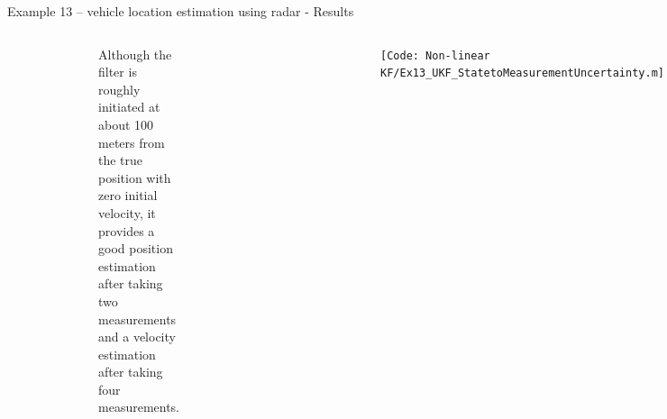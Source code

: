 \begin{frame}{Example 13 – vehicle location estimation using radar - Results}
\begin{columns}
\begin{figure}
    \vspace{-17pt}
\end{figure}
    {\footnotesize Although the filter is roughly initiated at about 100 meters from the true position with zero initial velocity, it provides a good position estimation after taking two measurements and a velocity estimation after taking four measurements.}
        \vspace{-25pt}
        \begin{figure}
            \centering
            \includegraphics[width=0.7\linewidth]{Figures//Part3/Ex13_Vehicle_xVelocity.png}
        \end{figure}
        \vspace{-15pt}
        \begin{figure}
            \centering
            \includegraphics[width=0.7\linewidth]{Figures//Part3/Ex13_Vehicle_yVelocity.png}
        \end{figure}

        \texttt{\tiny [Code: Non-linear KF/Ex13\_UKF\_StatetoMeasurementUncertainty.m]}
        
\end{columns}    
\end{frame}

